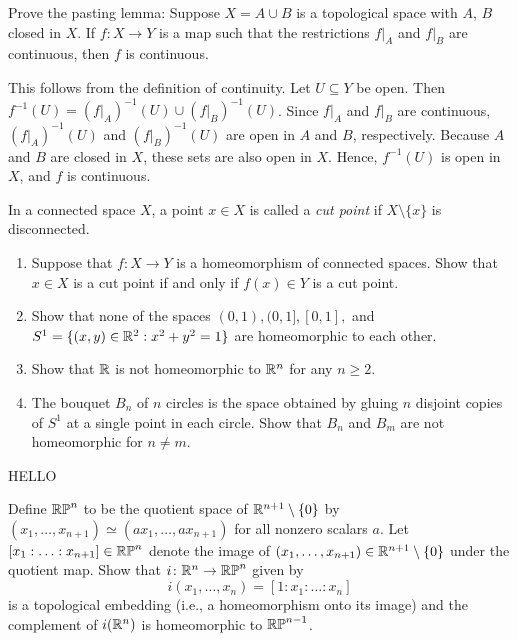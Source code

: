 \documentclass[12pt]{article}
\begin{document}
% 


\begin{problab}{1}
Prove the pasting lemma: Suppose $X = A \cup B$ is a topological space with $A$, $B$ closed in $X$. If $f \colon X \to Y$ is a map such that the restrictions $f|_A$ and $f|_B$ are continuous, then $f$ is continuous. 
\end{problab}
\begin{solu}
    This follows from the definition of continuity. Let $U \subseteq Y$ be open. Then $f^{-1}(U) = (f|_A)^{-1}(U) \cup (f|_B)^{-1}(U)$. Since $f|_A$ and $f|_B$ are continuous, $(f|_A)^{-1}(U)$ and $(f|_B)^{-1}(U)$ are open in $A$ and $B$, respectively. Because $A$ and $B$ are closed in $X$, these sets are also open in $X$. Hence, $f^{-1}(U)$ is open in $X$, and $f$ is continuous.
\end{solu}
\newpage

\begin{problab}{2}
In a connected space $X$, a point $x \in X$ is called a \emph{cut point} if $X \setminus \{ x \}$ is disconnected. 
    \begin{enumerate}
        \item Suppose that $f: X \to Y$ is a homeomorphism of connected spaces. Show that $x \in X$ is a cut point if and only if $f(x) \in Y$ is a cut point. 
        \item Show that none of the spaces $(0,1), (0,1], [0,1],$ and $S^1 = \{ (x,y) \in \mathbb R^2 : x^2 + y^2 =1 \} $ are homeomorphic to each other. 
        \item Show that $\mathbb R$ is not homeomorphic to $\mathbb R^n$ for any $n \geq 2$. 
        \item The bouquet $B_n$ of $n$ circles is the space obtained by gluing $n$ disjoint copies of $S^1$ at a single point in each circle. Show that $B_n$ and $B_m$ are not homeomorphic for $n \neq m$. 
    \end{enumerate}
\end{problab}
\begin{solu}
    HELLO
\end{solu}
\newpage

\begin{problab}{3}
Define $\mathbb{RP}^n$ to be the quotient space of $\mathbb R^{n+1}\setminus \{0\}$ by $(x_1, \hdots, x_{n+1}) \simeq (a x_1, \hdots, a x_{n+1})$ for all nonzero scalars $a$. Let $[x_1: \hdots : x_{n+1}] \in \mathbb{RP}^n$ denote the image of $(x_1, \hdots, x_{n+1}) \in \mathbb{R}^{n+1} \setminus \{ 0 \}$ under the quotient map. Show that $i \colon \mathbb{R}^n \to \mathbb{RP}^n$ given by 
$$ i (x_1, \hdots, x_n) = [1: x_1 : \hdots : x_n ] $$
is a topological embedding (i.e., a homeomorphism onto its image) and the complement of $i(\mathbb{R}^n)$ is homeomorphic to $\mathbb{RP}^{n-1}$.
\end{problab}
\end{document}
